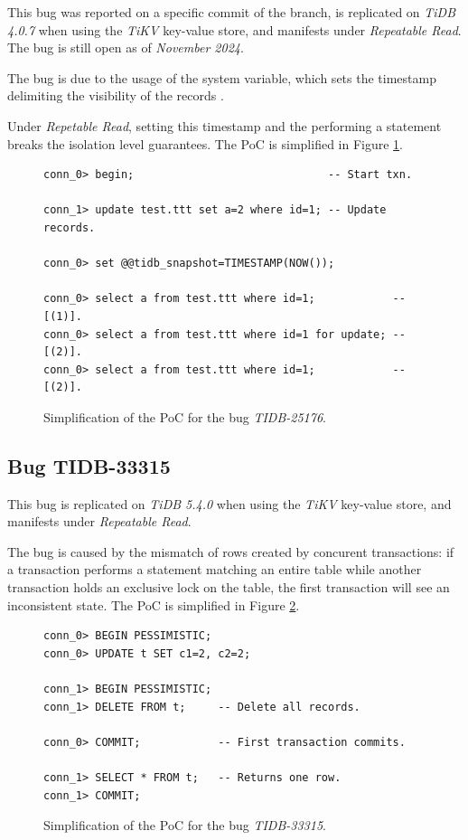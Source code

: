 This bug was reported on a specific commit of the  branch, is replicated on \textit{TiDB 4.0.7} when using the \textit{TiKV} key-value store, and manifests under \textit{Repeatable Read}. The bug is still open as of \textit{November 2024}.

The bug is due to the usage of the  system variable, which sets the timestamp delimiting the visibility of the records \cite{tidbsnapshot}. 

Under \textit{Repetable Read}, setting this timestamp and the performing a  statement breaks the isolation level guarantees. The PoC is simplified in Figure \ref{fig:TIDB-25176}.

\begin{figure}
\begin{verbatim}
conn_0> begin;                              -- Start txn.
    
conn_1> update test.ttt set a=2 where id=1; -- Update records.

conn_0> set @@tidb_snapshot=TIMESTAMP(NOW());

conn_0> select a from test.ttt where id=1;            -- [(1)].
conn_0> select a from test.ttt where id=1 for update; -- [(2)].
conn_0> select a from test.ttt where id=1;            -- [(2)].
\end{verbatim}
\caption{Simplification of the PoC for the bug \textit{TIDB-25176}.} \label{fig:TIDB-25176}
\end{figure}

\subsection*{Bug TIDB-33315}

This bug is replicated on \textit{TiDB 5.4.0} when using the \textit{TiKV} key-value store, and manifests under \textit{Repeatable Read}. 

The bug is caused by the mismatch of rows created by concurent transactions: if a transaction performs a statement matching an entire table while another transaction holds an exclusive lock on the table, the first transaction will see an inconsistent state. The PoC is simplified in Figure \ref{fig:TIDB-33315}.

\begin{figure}
\begin{verbatim}
conn_0> BEGIN PESSIMISTIC;
conn_0> UPDATE t SET c1=2, c2=2;

conn_1> BEGIN PESSIMISTIC;
conn_1> DELETE FROM t;     -- Delete all records.

conn_0> COMMIT;            -- First transaction commits.

conn_1> SELECT * FROM t;   -- Returns one row.
conn_1> COMMIT;
\end{verbatim}
\caption{Simplification of the PoC for the bug \textit{TIDB-33315}.} \label{fig:TIDB-33315}
\end{figure}


